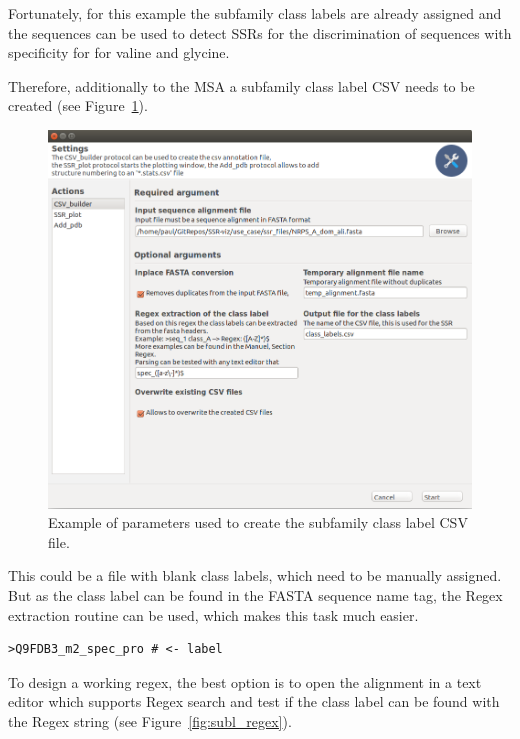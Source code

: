 \documentclass[a4paper,10pt]{article}
\begin{document}
Fortunately, for this example the subfamily class labels are already assigned and the sequences can be used to 
detect SSRs for the discrimination of sequences with specificity for for valine and glycine.

Therefore, additionally to the MSA a subfamily class label CSV needs to be created (see Figure~\ref{fig:csv_b_params}). 

\begin{figure}
  \includegraphics[width=\linewidth]{./figs/csv_b_params}
  \caption{Example of parameters used to create the subfamily class label CSV file.}
  \label{fig:csv_b_params}
\end{figure}

This could be a file with blank class labels, which need to be manually assigned. But as the class label can be found
in the FASTA sequence name tag, the Regex extraction routine can be used, which makes this task much easier.

\begin{verbatim}
>Q9FDB3_m2_spec_pro # <- label
\end{verbatim}

To design a working regex, the best option is to open the alignment in a text editor which supports Regex search and 
test if the class label can be found with the Regex string (see Figure~\ref{fig:subl_regex}). 
\end{document}
